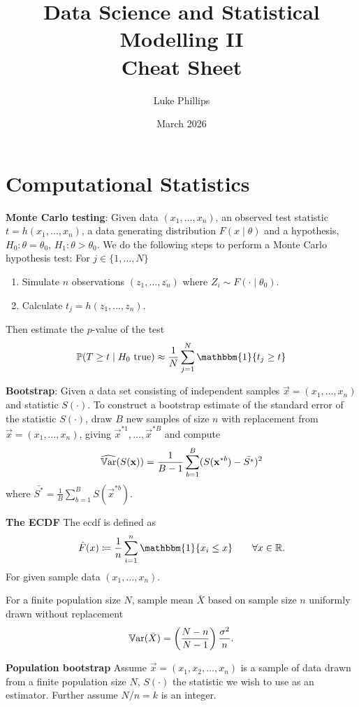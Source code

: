 \documentclass[10pt, a4paper]{article}
\title{Data Science and Statistical Modelling II \\
    \large Cheat Sheet}
\author{Luke Phillips}
\date{March 2026}
\begin{document}
\maketitle

\newpage

\section{Computational Statistics}

\textbf{Monte Carlo testing}:
Given data $(x_1, \dotsc, x_n)$,
an observed test statistic $t = h(x_1, \dotsc, x_n)$,
a data generating distribution $F(x \mid \theta)$ and a hypothesis,
$H_0 : \theta = \theta_0$,
$H_1 : \theta > \theta_0$.
We do the following steps to perform a Monte Carlo hypothesis test:
For $j \in \{1, \dotsc, N\}$
\begin{enumerate}[label = (\arabic*)]
    \item Simulate $n$ observations $(z_1, \dotsc, z_n)$ where $Z_i \sim F(\cdot\mid\theta_0)$.

    \item Calculate $t_j = h(z_1, \dotsc, z_n)$.
\end{enumerate}
Then estimate the $p$-value of the test
\[
\P(T \geq t \mid H_0\text{ true}) \approx \frac{1}{N}\sum_{j = 1}^{N}\mathbbm{1}\{t_j \geq t\}
\]


\textbf{Bootstrap}:
Given a data set consisting of independent samples $\vec{x} = (x_1, \dotsc, x_n)$ and statistic $S(\cdot)$.
To construct a bootstrap estimate of the standard error of the statistic $S(\cdot)$,
draw $B$ new samples of size $n$ with replacement from $\vec{x} = (x_1, \dotsc, x_n)$,
giving $\vec{x} ^ {*1}, \dotsc, \vec{x} ^ {*B}$ and compute
\[
\widehat{\mathbb{V}\mathrm{ar}}(S(\mathbf{x})) = \frac{1}{B - 1}\sum_{b = 1}^{B}(S(\mathbf{x} ^ {*b}) - \bar{S ^ {*}}) ^ 2
\]
where $\bar{S ^ {*}} = \frac{1}{B}\sum_{b = 1}^{B}S(\vec{x} ^ {*b})$.

\textbf{The ECDF}
The ecdf is defined as
\[
\hat{F}(x) \coloneqq \frac{1}{n}\sum_{i = 1}^{n}\mathbbm{1}\{x_i \leq x\}\qquad\forall x \in \R.
\]
For given sample data $(x_1, \dotsc, x_n)$.

For a finite population size $N$,
sample mean $\bar{X}$ based on sample size $n$ uniformly drawn without replacement
\[
\mathbb{V}\mathrm{ar}(\bar{X}) = \left(\frac{N - n}{N - 1}\right)\frac{\sigma ^ 2}{n}.
\]

\textbf{Population bootstrap}
Assume $\vec{x} = (x_1, x_2, \dotsc, x_n)$ is a sample of data drawn from a finite population size $N$,
$S(\cdot)$ the statistic we wish to use as an estimator.
Further assume $N / n = k$ is an integer.
\end{document}
